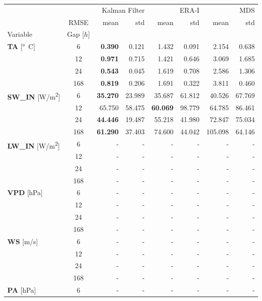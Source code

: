 \begin{table}
\centering
\begin{tabular}{p{2.1cm}c|rr|rr|rr}
\toprule
 &  & \multicolumn{2}{r}{Kalman Filter} & \multicolumn{2}{r}{ERA-I} & \multicolumn{2}{r}{MDS} \\
 & RMSE & mean & std & mean & std & mean & std \\
Variable & Gap [$h$] &  &  &  &  &  &  \\
\midrule
\multirow[c]{4}{*}{{\textbf{TA} [\si{°C}]}} & 6 & \bfseries 0.390 & 0.121 & 1.432 & 0.091 & 2.154 & 0.638 \\
 & 12 & \bfseries 0.971 & 0.715 & 1.421 & 0.646 & 3.069 & 1.685 \\
 & 24 & \bfseries 0.543 & 0.045 & 1.619 & 0.708 & 2.586 & 1.306 \\
 & 168 & \bfseries 0.819 & 0.206 & 1.691 & 0.322 & 3.811 & 0.460 \\
\cline{1-8}
\multirow[c]{4}{*}{{\textbf{SW\_IN} [\si{W/m^2}]}} & 6 & \bfseries 35.270 & 23.989 & 35.687 & 61.812 & 40.526 & 67.769 \\
 & 12 & 65.750 & 58.475 & \bfseries 60.069 & 98.779 & 64.785 & 86.461 \\
 & 24 & \bfseries 44.446 & 19.487 & 55.218 & 41.980 & 72.847 & 75.034 \\
 & 168 & \bfseries 61.290 & 37.403 & 74.600 & 44.042 & 105.098 & 64.146 \\
\cline{1-8}
\multirow[c]{4}{*}{{\textbf{LW\_IN} [\si{W/m^2}]}} & 6 & - & - & - & - & - & - \\
 & 12 & - & - & - & - & - & - \\
 & 24 & - & - & - & - & - & - \\
 & 168 & - & - & - & - & - & - \\
\cline{1-8}
\multirow[c]{4}{*}{{\textbf{VPD} [\si{hPa}]}} & 6 & - & - & - & - & - & - \\
 & 12 & - & - & - & - & - & - \\
 & 24 & - & - & - & - & - & - \\
 & 168 & - & - & - & - & - & - \\
\cline{1-8}
\multirow[c]{4}{*}{{\textbf{WS} [\si{m/s}]}} & 6 & - & - & - & - & - & - \\
 & 12 & - & - & - & - & - & - \\
 & 24 & - & - & - & - & - & - \\
 & 168 & - & - & - & - & - & - \\
\cline{1-8}
\multirow[c]{4}{*}{{\textbf{PA} [\si{hPa}]}} & 6 & - & - & - & - & - & - \\

\end{tabular}
\end{table}
